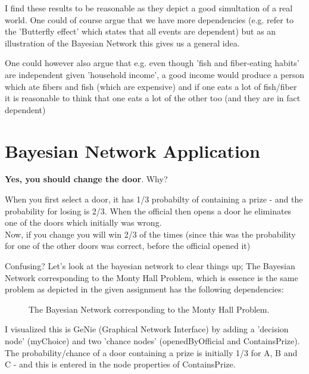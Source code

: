 \documentclass{article}
\begin{document}
I find these results to be reasonable as they depict a good simultation of a real world. One could of course
argue that we have more dependencies (e.g. refer to the 'Butterfly effect' which states that all events are dependent) but as an illustration of the Bayesian Network this gives us a general idea.

One could however also argue that e.g. even though 'fish and fiber-eating habits' are independent given 'household income', a good income would produce a person which ate fibers and fish (which are expensive) and if 
one eats a lot of fish/fiber it is reasonable to think that one eats a lot of the other too (and they are in
fact dependent)

\newpage
\section*{Bayesian Network Application}

{\bf Yes, you should change the door}. Why?

When you first select a door, it has 1/3 probabilty of containing a prize - and the probability for losing is 2/3. 
When the official then opens a door he eliminates one of the doors which initially was wrong. 
\\ Now, if you change you will win 2/3 of the times (since this was the probability for one of the other doors was correct, before the official opened it)

Confusing? Let's look at the bayesian network to clear things up; The Bayesian Network corresponding to the Monty Hall Problem, which is essence is the same problem as depicted in the given assignment has the following dependencies: \\

\begin{figure}[h]
\centering
{}
\caption{The Bayesian Network corresponding to the Monty Hall Problem. }
\end{figure}

I visualized this is GeNie (Graphical Network Interface) by adding a 'decision node' (myChoice) and two 'chance nodes' (openedByOfficial and ContainsPrize). 
The probability/chance of a door containing a prize is initially 1/3 for A, B and C - and this is entered in the node properties of ContainsPrize.
\end{document}
